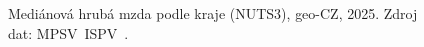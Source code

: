 \def\strProblemyRegionyMapaTitle{\acs{geo-CZ}: mediánová mzda podle kraje (\acs{ISPV} 2025/H1) --- index (medián \acs{geo-CZ}~=~100)}%
\def\strProblemyRegionyMapaColorbarLabel{index (medián \acs{geo-CZ} = 100)}%
\def\strProblemyRegionyMapaCaption{Mediánová hrubá mzda podle kraje (NUTS3), \acs{geo-CZ}, 2025. Zdroj dat: \acs{MPSV}~\acs{ISPV}~\cite{mpsv_ispv}.}%
%
\begin{figure}[htbp]
  \centering
  \resizebox{\linewidth}{!}{}
  \caption{\strProblemyRegionyMapaCaption}
  \label{fig:problemy_regiony_mapa}
\end{figure}
